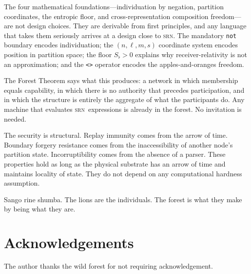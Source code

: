 \documentclass[twocolumn,11pt,a4paper]{article}
\theoremstyle{definition}
\theoremstyle{remark}
\newcommand{\srn}{\textsc{srn}}
\newcommand{\floor}{S_{\flat}}
\begin{document}
The four mathematical foundations---individuation by negation,
partition coordinates, the entropic floor, and cross-representation
composition freedom---are not design choices.  They are derivable from
first principles, and any language that takes them seriously arrives
at a design close to \srn.  The mandatory \lstinline|not| boundary
encodes individuation; the $(n,\ell,m,s)$ coordinate system encodes
position in partition space; the floor $\floor > 0$ explains why
receiver-relativity is not an approximation; and the \lstinline|<>|
operator encodes the apples-and-oranges freedom.

The Forest Theorem says what this produces: a network in which
membership equals capability, in which there is no authority that
precedes participation, and in which the structure is entirely the
aggregate of what the participants do.  Any machine that evaluates
\srn\ expressions is already in the forest.  No invitation is needed.

The security is structural.  Replay immunity comes from the arrow of
time.  Boundary forgery resistance comes from the inaccessibility of
another node's partition state.  Incorruptibility comes from the
absence of a parser.  These properties hold as long as the physical
substrate has an arrow of time and maintains locality of state.  They
do not depend on any computational hardness assumption.

Sango rine shumba.  The lions are the individuals.  The forest is what
they make by being what they are.

\section*{Acknowledgements}

The author thanks the wild forest for not requiring acknowledgement.



\end{document}
